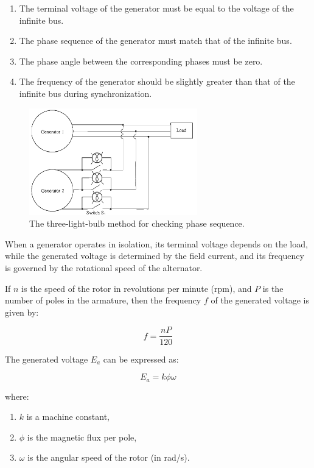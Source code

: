 \documentclass[a4paper,12pt]{article}
\begin{document}
\begin{enumerate}
	\item The terminal voltage of the generator must be equal to the voltage of the infinite bus.
	\item The phase sequence of the generator must match that of the infinite bus.
	\item The phase angle between the corresponding phases must be zero.
	\item The frequency of the generator should be slightly greater than that of the infinite bus during synchronization.
\end{enumerate}
	\begin{figure}[H]
	\centering
	\centering
	\includegraphics[width=0.65\textwidth]{Images/1}
	\caption{The three-light-bulb method for
		checking phase sequence.}
	
	
	
	
	
\end{figure}
When a generator operates in isolation, its terminal voltage depends on the load, while the generated voltage is determined by the field current, and its frequency is governed by the rotational speed of the alternator.

If \( n \) is the speed of the rotor in revolutions per minute (rpm), and \( P \) is the number of poles in the armature, then the frequency \( f \) of the generated voltage is given by:

\[
f = \frac{nP}{120}
\]

The generated voltage \( E_a \) can be expressed as:

\[
E_a = k \phi \omega
\]

where:
\begin{enumerate}
	\item \( k \) is a machine constant,
	\item \( \phi \) is the magnetic flux per pole,
	\item \( \omega \) is the angular speed of the rotor (in rad/s).
\end{enumerate}
\end{document}
